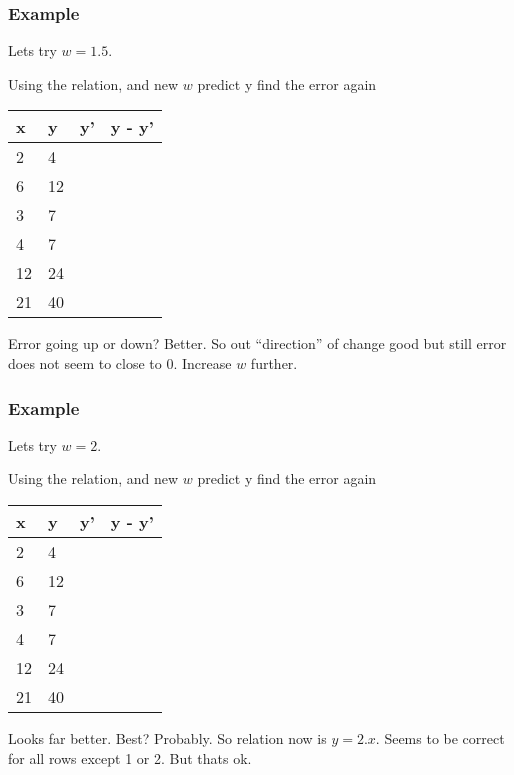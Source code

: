 \begin{frame}[fragile]\frametitle{Example}

Lets try  $w = 1.5$.

Using the relation, and new $w$ predict y find the error again

	\begin{table}[!h]
		\centering
		\begin{tabular}{| l | l | l| l|}
			\hline
			x & y & y' & y - y'\\ \hline
			2 & 4  & \\ \hline
			6 & 12 & \\ \hline
			3 & 7  & \\ \hline
			4 & 7 & \\ \hline
			12 & 24 & \\ \hline
			21 & 40 & \\ \hline			
		\end{tabular}
\end{table}

Error going up or down? Better. So out ``direction'' of change good but still error does not seem to close to 0. Increase $w$ further.

\end{frame}

\begin{frame}[fragile]\frametitle{Example}

Lets try  $w = 2$.

Using the relation, and new $w$ predict y find the error again

	\begin{table}[!h]
		\centering
		\begin{tabular}{| l | l | l| l|}
			\hline
			x & y & y' & y - y'\\ \hline
			2 & 4  & \\ \hline
			6 & 12 & \\ \hline
			3 & 7  & \\ \hline
			4 & 7 & \\ \hline
			12 & 24 & \\ \hline
			21 & 40 & \\ \hline			
		\end{tabular}
\end{table}

Looks far better. Best? Probably. So relation now is $y = 2.x$. Seems to be correct for all rows except 1 or 2. But thats ok.

\end{frame}

